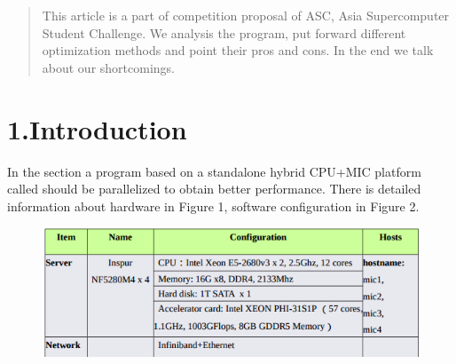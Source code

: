 \documentclass{article}
\begin{document}
\mdxtitleblockstart{}
\mdxauthorstart{}
\mdxauthorend\mdtitleauthorrunning{}{}\mdxtitleblockend%

\begin{abstract}%

\noindent{}This article is a part of competition proposal of ASC, Asia Supercomputer Student Challenge. We analysis the  program, put forward different optimization methods and point their pros and cons. In the end we talk about our shortcomings.%
\end{abstract}%

\section{1.\hspace*{0.5em}Introduction}\label{sec-introduction}%

\noindent{}In the section a program based on a standalone hybrid CPU+MIC platform called  should be parallelized to obtain better performance. There is detailed information about hardware in Figure 1, software configuration in Figure 2.%

\begin{figure}[tbp]%
\begin{mdcenter}%

\noindent{}\includegraphics[keepaspectratio=true,width=\dimmin{}{\dimwidth{0.90}}]{images/2016-02-18-23-01-13-}{}%

\mdhr{}%

\noindent{}%
\end{mdcenter}\label{fig-myfigure}%
\end{figure}%
\end{document}
